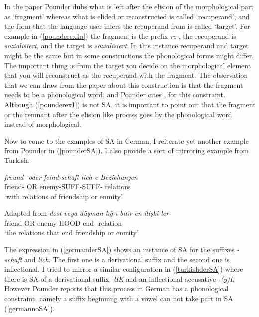 In the paper Pounder dubs what is left after the elision of the morphological part as `fragment' whereas what is elided or reconstructed is called `recuperand', and the form that the language user infers the recuperand from is called `target'. For example in (\ref{pounderex1a}) the fragment is the prefix \textit{re-}, the recuperand is \textit{sozialisiert}, and the target is \textit{sozialisiert}. In this instance recuperand and target might be the same but in some constructions the phonological forms might differ. The important thing is from the target you decide on the morphological element that you will reconstruct as the recuperand with the fragment. The observation that we can draw from the paper about this construction is that the fragment needs to be a phonological word, and Pounder cites \cite{smith2000word},  for this constraint. Although (\ref{pounderex1}) is not SA, it is important to point out that the fragment or the remnant after the elision like process goes by the phonological word instead of morphological. 

Now to come to the examples of SA in German, I reiterate yet another example from Pounder in (\ref{pounderSA}). I also provide a sort of mirroring example from Turkish.

\begin{exe}
    \ex \label{pounderSA}
    \begin{xlist}
        \ex \label{germanderSA}
        \gll 
        \textit{freund-} \textit{oder} \textit{feind-schaft-lich-e} \textit{Beziehungen} \\ friend- OR enemy-SUFF-SUFF-{\Pl} relations \\
        \glt `with relations of friendship or enmity'
        
        \hfill Adapted from \cite{pounder2006broken}
        \ex \label{turkishderSA} 
        \gll 
        \textit{dost} \textit{veya} \textit{düşman-lığ-ı} \textit{bitir-en} \textit{ilişki-ler} \\ friend OR enemy-HOOD end-{\Fp} relation-{\Pl} \\
        \glt `the relations that end friendship or enmity'
    \end{xlist}
\end{exe}

The expression in (\ref{germanderSA}) shows an instance of SA for the suffixes \textit{-schaft} and \textit{lich}. The first one is a derivational suffix and the second one is inflectional. I tried to mirror a similar configuration in (\ref{turkishderSA}) where there is SA of a derivational suffix \textit{-lIK} and an inflectional accusative \textit{-(y)I}. However Pounder reports that this process in German has a phonological constraint, namely a suffix beginning with a vowel can not take part in SA (\ref{germannoSA}).

